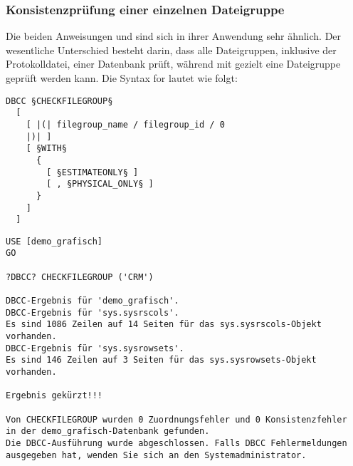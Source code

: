         \subsubsection{Konsistenzprüfung einer einzelnen Dateigruppe}
          Die beiden Anweisungen  und
           sind sich in ihrer Anwendung sehr
          ähnlich. Der wesentliche Unterschied besteht darin, dass
           alle Dateigruppen, inklusive der Protokolldatei,
          einer Datenbank prüft, während mit 
          gezielt eine Dateigruppe geprüft werden kann. Die Syntax for
           lautet wie folgt:
          \begin{lstlisting}[language=ebnf, caption={Die Syntax zu
          CHECKFILEGROUP}, label=admin03_31]
DBCC §CHECKFILEGROUP§
  [
    [ |(| filegroup_name / filegroup_id / 0 
    |)| ]
    [ §WITH§
      {
        [ §ESTIMATEONLY§ ]
        [ , §PHYSICAL_ONLY§ ]
      }
    ]
  ]        
        \end{lstlisting}
        \begin{lstlisting}[language=ms_sql,caption={Konsistenzprüfung
        einer Dateigruppe},label=admin03_32] 
USE [demo_grafisch]
GO

?DBCC? CHECKFILEGROUP ('CRM')

DBCC-Ergebnis für 'demo_grafisch'.
DBCC-Ergebnis für 'sys.sysrscols'.
Es sind 1086 Zeilen auf 14 Seiten für das sys.sysrscols-Objekt vorhanden.
DBCC-Ergebnis für 'sys.sysrowsets'.
Es sind 146 Zeilen auf 3 Seiten für das sys.sysrowsets-Objekt vorhanden.

Ergebnis gekürzt!!!

Von CHECKFILEGROUP wurden 0 Zuordnungsfehler und 0 Konsistenzfehler
in der demo_grafisch-Datenbank gefunden.
Die DBCC-Ausführung wurde abgeschlossen. Falls DBCC Fehlermeldungen 
ausgegeben hat, wenden Sie sich an den Systemadministrator.
        \end{lstlisting}
